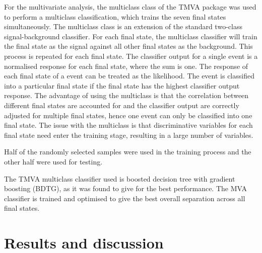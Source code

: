 \documentclass[a4paper,11pt]{article}
\begin{document}
For the multivariate analysis, the multiclass class of the TMVA package \cite{Therhaag:2009dp} was used to perform a multiclass classification, which trains the seven final states simultaneously. The multiclass class is an extension of the standard two-class signal-background classifier. For each final state, the multiclass classifier will train the final state as the signal against all other final states as the background. This process is repeated for each final state. The classifier output for a single event is a normalised response for each final state, where the sum is one. The response of each final state of a event can be treated as the likelihood. The event is classified into a particular final state if the final state has the highest classifier output response. The advantage of using the multiclass is that the correlation between different final states are accounted for and the classifier output are correctly adjusted for multiple final states, hence one event can only be classified into one final state. The issue with the multiclass is that discriminative variables for each final state need enter the training stage, resulting in a large number of variables. 

Half of the randomly selected samples were used in the training process and the other half were used for testing. 

The TMVA multiclass classifier used is boosted decision tree with gradient boosting (BDTG), as it was found to give for the best performance. The MVA classifier is trained and optimised to give the best overall separation across all final states.

\section{Results and discussion}
\end{document}
